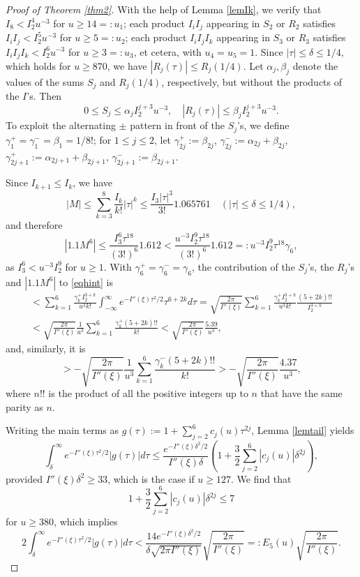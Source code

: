 \documentclass[11pt]{amsart}
\begin{document}
\begin{proof}[Proof of Theorem \ref{thm2}]
With the help of Lemma \ref{lemIk}, we verify that $I_8 < I_2^4 u^{-3}$ for $u\ge 14=:u_1$; 
each product $I_i I_j$ appearing in $S_2$ or $R_2$ satisfies $I_i I_j < I_2^5  u^{-3}$ for $u\ge 5=:u_2$;
each product $I_i I_j I_k$ appearing in $S_3$ or $R_3$ satisfies $I_i I_j I_k < I_2^6  u^{-3}$ for $u\ge 3=:u_3$, et cetera,
with $u_4=u_5=1$. 
Since $|\tau|\le \delta \le 1/4$, which holds for $u\ge 870$, we have $|R_j(\tau)| \le R_j(1/4) $.
Let $ \alpha_j, \beta_j$ denote the values of the
sums $S_j$ and $R_j(1/4)$, respectively, but without the products of the $I$'s. Then
$$
0\le  S_j \le \alpha_j I_2^{j+3} u^{-3},\quad |R_j(\tau)| \le \beta_j  I_2^{j+3} u^{-3}.
$$
To exploit the alternating $\pm$ pattern in front of the $S_j$'s, we define $\gamma_1^+=\gamma_1^-=\beta_1=1/8!$; 
for $1\le j \le 2$, let  
$\gamma^+_{2j}:=\beta_{2j}$, 
$\gamma^-_{2j}:=\alpha_{2j}+\beta_{2j}$,
$\gamma^+_{2j+1}:=\alpha_{2j+1}+\beta_{2j+1}$,
$\gamma^-_{2j+1}:=\beta_{2j+1}$.

Since $I_{k+1}\le I_k$, we have
$$
|M|\le \sum_{k=3}^8 \frac{I_k}{k!}|\tau|^k \le \frac{I_3 |\tau|^3}{3!} 1.065761 \quad  (|\tau|\le \delta \le 1/4),
$$
and therefore
$$
|1.1 M^6| \le \frac{I_3^6 \tau^{18}}{(3!)^6} 1.612 <  \frac{u^{-3} I_2^9 \tau^{18}}{(3!)^6} 1.612
 =: u^{-3} I_2^9 \tau^{18} \gamma_6,
$$
as $I_3^6< u^{-3}I_2^9$ for $u\ge 1$. 
With $\gamma_6^+=\gamma_6^-=\gamma_6$, 
the contribution of the $S_j$'s, the $R_j$'s and $|1.1 M^6|$ to \eqref{eqhint} is 
\begin{multline*}
< \sum_{k=1}^6 \frac{\gamma_k^+  I_2^{3+k}}{u^3 k!} \int_{-\infty}^\infty e^{-I''(\xi)\tau^2/2} \tau^{6+2k} d\tau
= \sqrt{\frac{2\pi}{I''(\xi)}}\sum_{k=1}^6 \frac{\gamma_k^+  I_2^{3+k}}{u^3 k!} \frac{(5+2k)!!}{I_2^{3+k}}\\
< \sqrt{\frac{2\pi}{I''(\xi)}}\frac{1}{u^3}\sum_{k=1}^6 \frac{\gamma_k^+ (5+2k)!!}{k!}
< \sqrt{\frac{2\pi}{I''(\xi)}} \frac{5.39}{u^3},
\end{multline*}
and, similarly, it is
$$
>- \sqrt{\frac{2\pi}{I''(\xi)}}\frac{1}{u^3}\sum_{k=1}^6 \frac{\gamma_k^- (5+2k)!!}{k!}
>- \sqrt{\frac{2\pi}{I''(\xi)}} \frac{4.37}{u^3},
$$
where $n!!$ is the product of all the positive integers up to $n$ that have the same parity as $n$.

Writing the main terms as 
$g(\tau):=1+\sum_{j=2}^6 c_j(u) \tau^{2j}$, Lemma \ref{lemtail} yields
$$
\int_\delta^\infty  e^{-I''(\xi)\tau^2/2} |g(\tau)| d\tau 
\le \frac{e^{-I''(\xi) \delta^2/2}}{I''(\xi) \delta} \left(1 + \frac{3}{2}\sum_{j=2}^6 |c_j(u)| \delta^{2j} \right) , 
$$
provided $I''(\xi)\delta^2 \ge 33$, which is the case if $u\ge 127$. 
We find that
$$
1 + \frac{3}{2}\sum_{j=2}^6 |c_j(u)| \delta^{2j} \le 7
$$
for $u\ge 380$, which implies
$$
2\int_\delta^\infty  e^{-I''(\xi)\tau^2/2}|g(\tau)| d\tau 
< \frac{ 14e^{-I''(\xi) \delta^2/2}}{ \delta \sqrt{2\pi I''(\xi)} }  \sqrt{\frac{2\pi}{ I''(\xi)}}
=: E_5(u)  \sqrt{\frac{2\pi}{ I''(\xi)}}.
$$


\end{proof}
\end{document}
